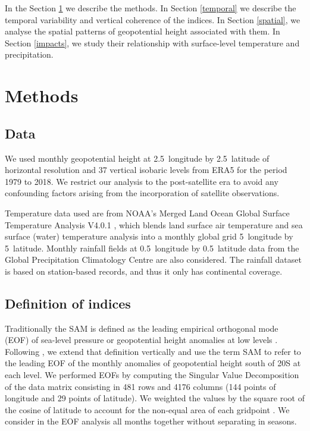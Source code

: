 \documentclass[smallextended]{svjour3}       %
\begin{document}
In the Section \ref{methods} we describe the methods. In Section \ref{temporal} we describe the temporal variability and vertical coherence of the indices. In Section \ref{spatial}, we analyse the spatial patterns of geopotential height associated with them. In Section \ref{impacts}, we study their relationship with surface-level temperature and precipitation.

\hypertarget{methods}{%
\section{Methods}\label{methods}}

\hypertarget{data}{%
\subsection{Data}\label{data}}

We used monthly geopotential height at 2.5\degree~longitude by 2.5\degree~latitude of horizontal resolution and 37 vertical isobaric levels from ERA5 \citep{hersbach2020} for the period 1979 to 2018. We restrict our analysis to the post-satellite era to avoid any confounding factors arising from the incorporation of satellite observations.

Temperature data used are from NOAA's Merged Land Ocean Global Surface Temperature Analysis V4.0.1 \citep{smith2008, vose2012}, which blends land surface air temperature and sea surface (water) temperature analysis into a monthly global grid 5\degree~longitude by 5\degree~latitude. Monthly rainfall fields at 0.5\degree~longitude by 0.5\degree~latitude data from the Global Precipitation Climatology Centre \citep{schneider2015, schneider2017} are also considered. The rainfall dataset is based on station-based records, and thus it only has continental coverage.

\hypertarget{definition-of-indices}{%
\subsection{Definition of indices}\label{definition-of-indices}}

Traditionally the SAM is defined as the leading empirical orthogonal mode (EOF) of sea-level pressure or geopotential height anomalies at low levels \citep{ho2012}. Following \citet{baldwin2001}, we extend that definition vertically and use the term SAM to refer to the leading EOF of the monthly anomalies of geopotential height south of 20\degree S at each level. We performed EOFs by computing the Singular Value Decomposition of the data matrix consisting in 481 rows and 4176 columns (144 points of longitude and 29 points of latitude). We weighted the values by the square root of the cosine of latitude to account for the non-equal area of each gridpoint \citep{chung1999}. We consider in the EOF analysis all months together without separating in seasons.
\end{document}
